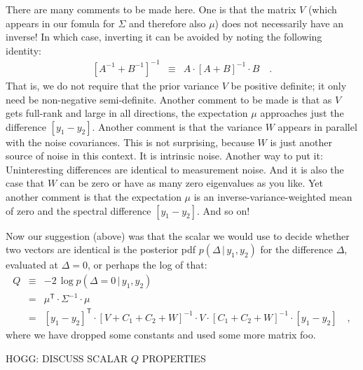\documentclass[12pt,letterpaper]{article}
\newcommand{\tra}[1]{{#1}^{\mathsf{T}}}
\newcommand{\inv}[1]{{#1}^{-1}}
\newcommand{\given}{\,|\,}
\begin{document}
There are many comments to be made here. One is that the matrix $V$
(which appears in our fomula for $\Sigma$ and therefore also $\mu$)
does not necessarily have an inverse! In which case, inverting it can
be avoided by noting the following identity:
\begin{eqnarray}
  \inv{[\inv{A} + \inv{B}]} &\equiv& A\cdot\inv{[A + B]}\cdot B
\quad .
\end{eqnarray}
That is, we do not require that the prior variance $V$ be positive
definite; it only need be non-negative semi-definite.
Another comment to be made is that as $V$ gets full-rank and large
in all directions, the expectation $\mu$ approaches just the difference
$[y_1-y_2]$.
Another comment is that the variance $W$ appears in parallel with the
noise covariances. This is not surprising, because $W$ is just another
source of noise in this context. It is intrinsic noise. Another way
to put it: Uninteresting differences are identical to measurement noise.
And it is also the case that $W$ can be zero or have as many zero
eigenvalues as you like.
Yet another comment is that the expectation $\mu$ is an inverse-variance-weighted
mean of zero and the spectral difference $[y_1-y_2]$. And so on!

Now our suggestion (above) was that the scalar we would use to decide
whether two vectors are identical is the posterior pdf $p(\Delta\given
y_1,y_2)$ for the difference $\Delta$, evaluated at $\Delta=0$, or
perhaps the log of that:
\begin{eqnarray}
  Q &\equiv& -2\,\log p(\Delta=0\given y_1,y_2)
\\
    &=& \tra{\mu}\cdot\inv{\Sigma}\cdot\mu
\\
    &=& \tra{[y_1-y_2]}\cdot\inv{[V + C_1 + C_2 + W]}\cdot V\cdot\inv{[C_1 + C_2 + W]}\cdot[y_1-y_2]
\quad ,
\end{eqnarray}
where we have dropped some constants and used some more matrix foo.

HOGG: DISCUSS SCALAR $Q$ PROPERTIES
\end{document}
